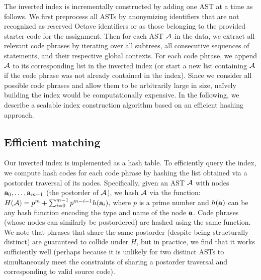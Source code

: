 The inverted index is incrementally constructed by adding one AST at a time as follows.
We first preprocess all ASTs by anonymizing identifiers that are not recognized as reserved Octave 
identifiers or as those belonging to the provided starter code for the assignment.
Then for each AST $\mathcal{A}$ in the data,
we extract all relevant code phrases by iterating over all subtrees, all consecutive sequences of statements, 
and their respective global contexts. For each code phrase, we append $\mathcal{A}$ to its corresponding list in the inverted
index (or start a new list containing $\mathcal{A}$ if the code phrase was not already contained in the index).	
Since we consider all possible code phrases and allow them to be arbitrarily large in size,
na\"{i}vely building the index would be computationally expensive.  In the following, we describe a scalable index
construction algorithm based on an efficient hashing approach.



\subsection{Efficient matching}
Our inverted index is implemented as a hash table.  To efficiently query the index, we compute
hash codes for each code phrase by hashing the list obtained via a postorder traversal of its nodes.
Specifically, given an AST $\mathcal{A}$ with nodes ${\bf a}_{0},\dots,{\bf a}_{m-1}$ (the postorder of $\mathcal{A}$),
we hash $\mathcal{A}$ via the function:
$
H(\mathcal{A}) =  p^m + \sum_{i=0}^{m-1} p^{m-i-1} h({\bf a}_{i}), 
$
where $p$ is a prime number and $h({\bf a})$ can be any hash function encoding the type and name of the node ${\bf a}$.
Code phrases (whose nodes can similarly be postordered) are hashed using the same function.
We note that phrases that share the same postorder (despite being structurally distinct) are guaranteed to collide under $H$, but 
in practice, we find that it works sufficiently well (perhaps because it is unlikely for two distinct ASTs to simultaneously meet
the constraints of sharing a postorder traversal and corresponding to valid source code).



